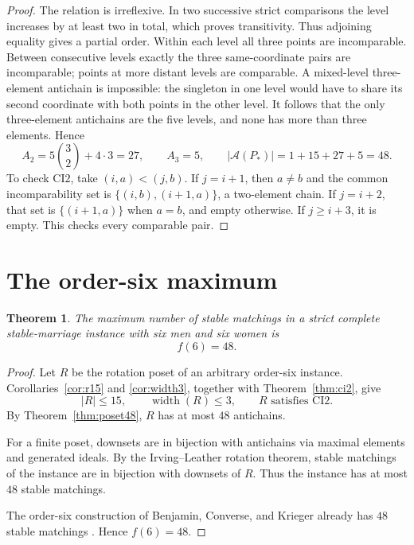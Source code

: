 \documentclass[11pt]{article}
\numberwithin{equation}{section}
\newtheorem{theorem}{Theorem}[section]
\theoremstyle{definition}
\theoremstyle{remark}
\newcommand{\A}{\mathcal A}
\begin{document}
\begin{proof}
The relation is irreflexive.  In two successive strict comparisons the
level increases by at least two in total, which proves transitivity.
Thus adjoining equality gives a partial order.
Within each level all three points are incomparable.  Between consecutive
levels exactly the three same-coordinate pairs are incomparable; points
at more distant levels are comparable.  A mixed-level three-element
antichain is impossible: the singleton in one level would have to share
its second coordinate with both points in the other level.  It follows that
the only three-element antichains are the five levels, and none has more
than three elements.  Hence
\begin{equation}\label{eq:explicit-counts}
       A_2=5\binom32+4\cdot3=27,\qquad A_3=5,
       \qquad |\A(P_*)|=1+15+27+5=48.
\end{equation}
To check $\mathrm{CI2}$, take $(i,a)<(j,b)$.  If $j=i+1$, then
$a\ne b$ and the common incomparability set is
$\{(i,b),(i+1,a)\}$, a two-element chain.  If $j=i+2$, that set is
$\{(i+1,a)\}$ when $a=b$, and empty otherwise.  If $j\ge i+3$, it is
empty.  This checks every comparable pair.
\end{proof}

\section{The order-six maximum}

\begin{theorem}\label{thm:main}
The maximum number of stable matchings in a strict complete stable-marriage
instance with six men and six women is
\[
        f(6)=48.
\]
\end{theorem}

\begin{proof}
Let $R$ be the rotation poset of an arbitrary order-six instance.
Corollaries~\ref{cor:r15} and \ref{cor:width3}, together with
Theorem~\ref{thm:ci2}, give
\[
        |R|\le15,\qquad
        \operatorname{width}(R)\le3,\qquad
        R\text{ satisfies }\mathrm{CI2}.
\]
By Theorem~\ref{thm:poset48}, $R$ has at most $48$ antichains.

For a finite poset, downsets are in bijection with antichains via maximal
elements and generated ideals.  By the Irving--Leather rotation theorem,
stable matchings of the instance are in bijection with downsets of $R$.
Thus the instance has at most $48$ stable matchings.

The order-six construction of Benjamin, Converse, and Krieger already
has $48$ stable matchings \cite{BenjaminCK1995}.  Hence $f(6)=48$.
\end{proof}
\end{document}
